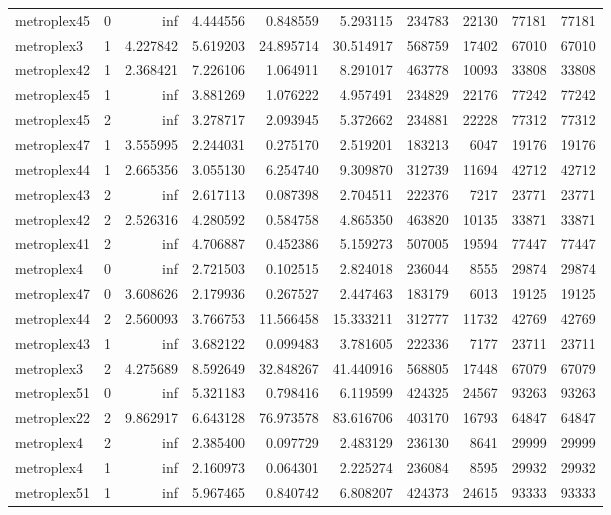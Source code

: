 \begin{longtable}{|l|r|r|r|r|r|r|r|r|r|}
metroplex45 & 0 & inf & 4.444556 & 0.848559 & 5.293115 & 234783 & 22130 & 77181 & 77181 \\
metroplex3 & 1 & 4.227842 & 5.619203 & 24.895714 & 30.514917 & 568759 & 17402 & 67010 & 67010 \\
metroplex42 & 1 & 2.368421 & 7.226106 & 1.064911 & 8.291017 & 463778 & 10093 & 33808 & 33808 \\
metroplex45 & 1 & inf & 3.881269 & 1.076222 & 4.957491 & 234829 & 22176 & 77242 & 77242 \\
metroplex45 & 2 & inf & 3.278717 & 2.093945 & 5.372662 & 234881 & 22228 & 77312 & 77312 \\
metroplex47 & 1 & 3.555995 & 2.244031 & 0.275170 & 2.519201 & 183213 & 6047 & 19176 & 19176 \\
metroplex44 & 1 & 2.665356 & 3.055130 & 6.254740 & 9.309870 & 312739 & 11694 & 42712 & 42712 \\
metroplex43 & 2 & inf & 2.617113 & 0.087398 & 2.704511 & 222376 & 7217 & 23771 & 23771 \\
metroplex42 & 2 & 2.526316 & 4.280592 & 0.584758 & 4.865350 & 463820 & 10135 & 33871 & 33871 \\
metroplex41 & 2 & inf & 4.706887 & 0.452386 & 5.159273 & 507005 & 19594 & 77447 & 77447 \\
metroplex4 & 0 & inf & 2.721503 & 0.102515 & 2.824018 & 236044 & 8555 & 29874 & 29874 \\
metroplex47 & 0 & 3.608626 & 2.179936 & 0.267527 & 2.447463 & 183179 & 6013 & 19125 & 19125 \\
metroplex44 & 2 & 2.560093 & 3.766753 & 11.566458 & 15.333211 & 312777 & 11732 & 42769 & 42769 \\
metroplex43 & 1 & inf & 3.682122 & 0.099483 & 3.781605 & 222336 & 7177 & 23711 & 23711 \\
metroplex3 & 2 & 4.275689 & 8.592649 & 32.848267 & 41.440916 & 568805 & 17448 & 67079 & 67079 \\
metroplex51 & 0 & inf & 5.321183 & 0.798416 & 6.119599 & 424325 & 24567 & 93263 & 93263 \\
metroplex22 & 2 & 9.862917 & 6.643128 & 76.973578 & 83.616706 & 403170 & 16793 & 64847 & 64847 \\
metroplex4 & 2 & inf & 2.385400 & 0.097729 & 2.483129 & 236130 & 8641 & 29999 & 29999 \\
metroplex4 & 1 & inf & 2.160973 & 0.064301 & 2.225274 & 236084 & 8595 & 29932 & 29932 \\
metroplex51 & 1 & inf & 5.967465 & 0.840742 & 6.808207 & 424373 & 24615 & 93333 & 93333 \\

\end{longtable}
